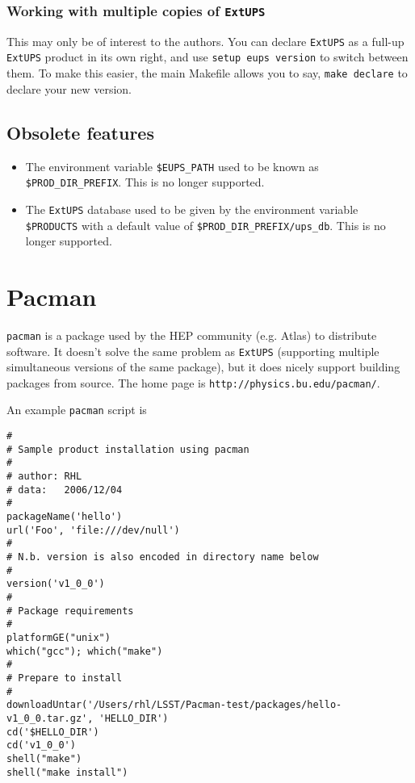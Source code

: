 \documentclass{article}
\newcommand{\code}[1]{\texttt{#1}}
\newcommand{\eups}{\code{ExtUPS}}
\newcommand{\pacman}{\code{pacman}}
\begin{document}
\subsubsection{Working with multiple copies of \eups}

This may only be of interest to the authors.  You can declare \eups{} as a full-up
\eups{} product in its own right, and use \code{setup eups version} to switch
between them.  To make this easier, the main Makefile allows you to say,
\code{make declare} to declare your new version.

\subsection{Obsolete features}

\begin{itemize}
  \item The environment variable \code{\$EUPS\_PATH} used to be known
  as \code{\$PROD\_DIR\_PREFIX}. This is no longer supported.

  \item The \eups{} database used to be given by the environment variable \code{\$PRODUCTS}
    with a default value of \code{\$PROD\_DIR\_PREFIX/ups\_db}. This is no longer supported.
\end{itemize}

\section{Pacman}
\label{pacman}

\pacman{} is a package used by the HEP community (e.g. Atlas) to distribute
software.  It doesn't solve the same problem as \eups{} (supporting 
multiple simultaneous versions of the same package), but it does nicely
support building packages from source.  The home page is \code{http://physics.bu.edu/pacman/}.

An example \pacman{} script is
\begin{verbatim}
#
# Sample product installation using pacman
#
# author: RHL
# data:   2006/12/04
#
packageName('hello')
url('Foo', 'file:///dev/null')
#
# N.b. version is also encoded in directory name below
#
version('v1_0_0')
#
# Package requirements
#
platformGE("unix")
which("gcc"); which("make")
#
# Prepare to install
#
downloadUntar('/Users/rhl/LSST/Pacman-test/packages/hello-v1_0_0.tar.gz', 'HELLO_DIR')
cd('$HELLO_DIR')
cd('v1_0_0')
shell("make")
shell("make install")
\end{verbatim}
\end{document}
